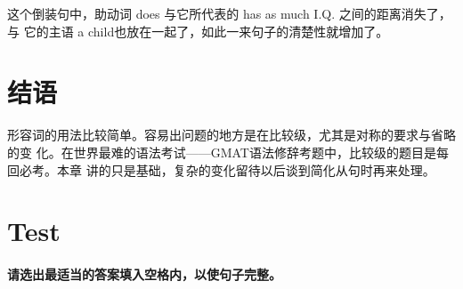 \documentclass{yufa}
\begin{document}
这个倒装句中，助动词 does 与它所代表的 has as much I.Q. 之间的距离消失了，与
它的主语 a child也放在一起了，如此一来句子的清楚性就增加了。

\section{结语}

形容词的用法比较简单。容易出问题的地方是在比较级，尤其是对称的要求与省略的变
化。在世界最难的语法考试——GMAT语法修辞考题中，比较级的题目是每回必考。本章
讲的只是基础，复杂的变化留待以后谈到简化从句时再来处理。

\section{Test}

\paragraph{请选出最适当的答案填入空格内，以使句子完整。}
\end{document}
